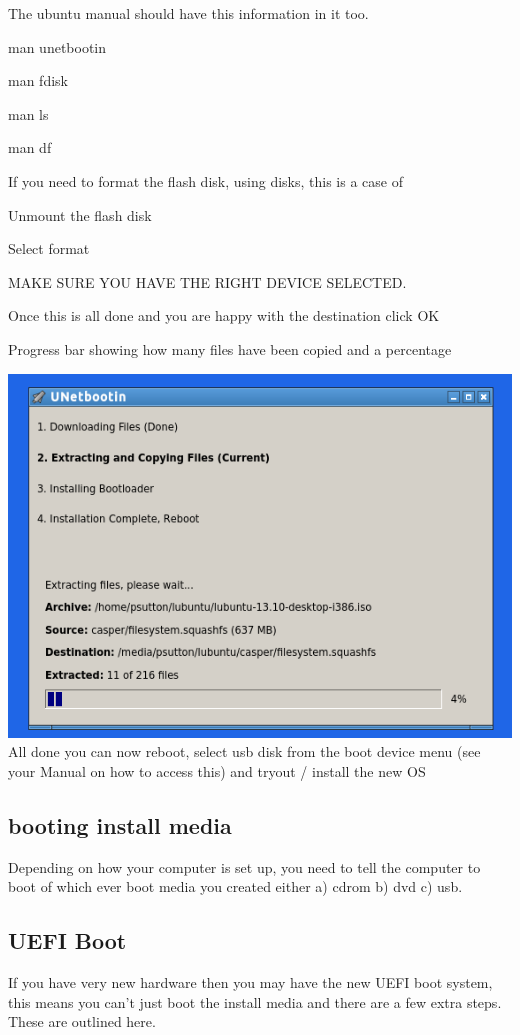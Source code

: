 \documentclass[12pt,a4paper]{book}
\begin{document}
The ubuntu manual should have this information in it too.

man unetbootin

man fdisk

man ls

man df

If you need to format the flash disk, using disks, this is a case of

Unmount the flash disk

Select format

MAKE SURE YOU HAVE THE RIGHT DEVICE SELECTED.

Once this is all done and you are happy with the destination click OK

Progress bar showing how many files have been copied and a percentage


\includegraphics[width=0.7\linewidth]{unetbootin5} \\

All done you can now reboot, select usb disk from the boot device menu (see your Manual on how to access this) and tryout /  install the new OS

\subsection{booting install media}
Depending on how your computer is set up,  you need to tell the computer to boot of which ever boot media you created either a) cdrom b) dvd c) usb.

\subsection{UEFI Boot}
If you have very new hardware then you may have the new UEFI boot system,  this means you can't just boot the install media and there are a few extra steps.  These are outlined here.
\end{document}
